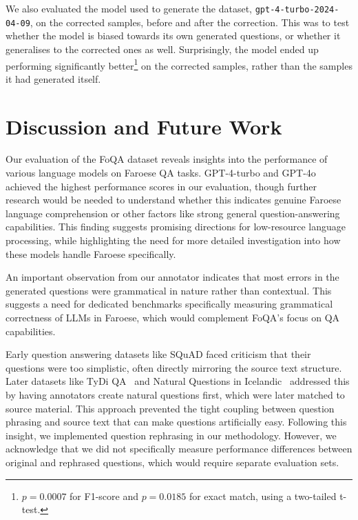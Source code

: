 \documentclass[11pt]{article}
\begin{document}
We also evaluated the model used to generate the dataset,
\texttt{gpt-4-turbo-2024-04-09}, on the corrected samples, before and after the
correction. This was to test whether the model is biased towards its own generated
questions, or whether it generalises to the corrected ones as well. Surprisingly, the
model ended up performing significantly better\footnote{$p=0.0007$ for F1-score and
$p=0.0185$ for exact match, using a two-tailed t-test.} on the corrected samples, rather
than the samples it had generated itself.


\section{Discussion and Future Work}

Our evaluation of the FoQA dataset reveals insights into the performance of various
language models on Faroese QA tasks. GPT-4-turbo and GPT-4o achieved the highest
performance scores in our evaluation, though further research would be needed to
understand whether this indicates genuine Faroese language comprehension or other
factors like strong general question-answering capabilities. This finding suggests
promising directions for low-resource language processing, while highlighting the need
for more detailed investigation into how these models handle Faroese specifically.

An important observation from our annotator indicates that most errors in the generated
questions were grammatical in nature rather than contextual. This suggests a need for
dedicated benchmarks specifically measuring grammatical correctness of LLMs in Faroese,
which would complement FoQA's focus on QA capabilities.

Early question answering datasets like SQuAD faced criticism that their questions were
too simplistic, often directly mirroring the source text structure. Later datasets like
TyDi QA~\cite{10.1162/tacl_a_00317} and Natural Questions in
Icelandic~\cite{snaebjarnarson-einarsson-2022-natural} addressed this by having
annotators create natural questions first, which were later matched to source material.
This approach prevented the tight coupling between question phrasing and source text
that can make questions artificially easy. Following this insight, we implemented
question rephrasing in our methodology. However, we acknowledge that we did not
specifically measure performance differences between original and rephrased questions,
which would require separate evaluation sets.
\end{document}
